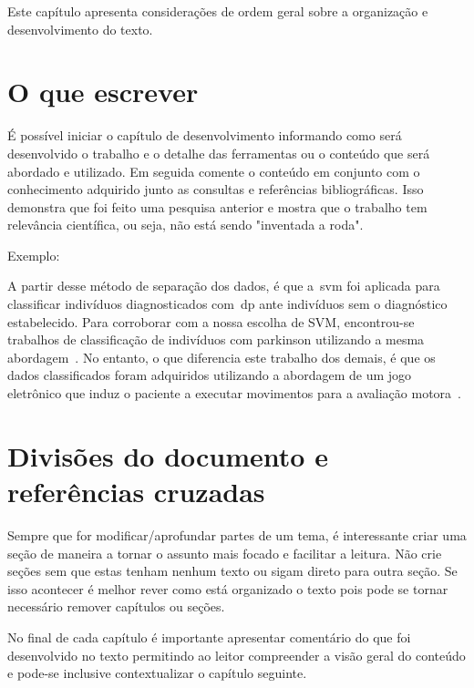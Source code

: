 
\label{Cap:desenvolvimento}

Este capítulo apresenta considerações de ordem geral sobre a
organização e desenvolvimento do texto.

\section{O que escrever}
\label{Sec:oque}

É possível iniciar o capítulo de desenvolvimento informando como será desenvolvido o trabalho e o detalhe das ferramentas ou o conteúdo que será abordado e utilizado. Em seguida comente o conteúdo em conjunto com o conhecimento adquirido junto as consultas e referências bibliográficas. 
Isso demonstra que foi feito uma pesquisa anterior e mostra que o trabalho tem relevância científica, ou seja, não está sendo "inventada a roda". 




Exemplo:


A partir desse método de separação dos dados, é que a~\ac{svm} foi aplicada para classificar indivíduos diagnosticados com~\ac{dp} ante indivíduos sem o diagnóstico estabelecido. Para corroborar com a nossa escolha de SVM, encontrou-se trabalhos de classificação de indivíduos com parkinson utilizando a mesma abordagem~\cite{bradmonitor2015,svmparkinson2010,patel_monitoring_2009}. No entanto, o que diferencia este trabalho dos demais, é que os dados classificados foram adquiridos utilizando a abordagem de um jogo eletrônico que induz o paciente a executar movimentos para a avaliação motora~\cite{quantitativeparkinson2011,wiiassesspark2016}. 




\section{Divisões do documento e referências cruzadas}
\label{Sec:divisoes}

Sempre que for modificar/aprofundar partes de um tema, é interessante criar uma seção de maneira a tornar o assunto mais focado e facilitar a leitura. 
Não crie seções sem que estas tenham nenhum texto ou sigam direto para outra seção. Se isso acontecer é melhor rever como está organizado o texto pois pode se tornar necessário remover capítulos ou seções. 

No final de cada capítulo é importante apresentar comentário do que foi desenvolvido no texto permitindo ao leitor compreender a visão geral do conteúdo e pode-se inclusive contextualizar o capítulo seguinte.



